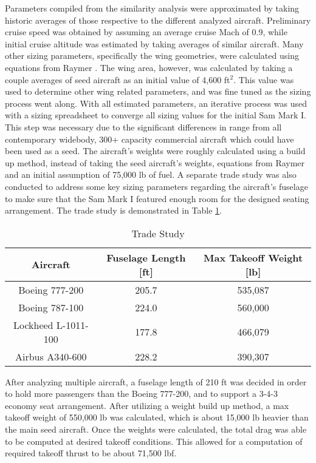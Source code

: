 Parameters compiled from the similarity analysis were approximated by taking historic averages of those respective to the different analyzed aircraft. Preliminary cruise speed was obtained by assuming an average cruise Mach of 0.9, while initial cruise altitude was estimated by taking averages of similar aircraft. Many other sizing parameters, specifically the wing geometries, were calculated using equations from Raymer \cite{raymer}. The wing area, however, was calculated by taking a couple averages of seed aircraft as an initial value of 4,600 ft$^2$. This value was used to determine other wing related parameters, and was fine tuned as the sizing process went along. With all estimated parameters, an iterative process was used with a sizing spreadsheet to converge all sizing values for the initial Sam Mark I. This step was necessary due to the significant differences in range from all contemporary widebody, 300+ capacity commercial aircraft which could have been used as a seed.  The aircraft's weights were roughly calculated using a build up method, instead of taking the seed aircraft's weights, equations from Raymer \cite{raymer} and an initial assumption of 75,000 lb of fuel. A separate trade study was also conducted to address some key sizing parameters regarding the aircraft's fuselage to make sure that the Sam Mark I featured enough room for the designed seating arrangement. The trade study is demonstrated in Table \ref{tab:trade_params}.

\begin{table}[!h] 
    \centering
    \caption{Trade Study}
    \begin{tabular}{ |c||c||c| }\toprule
    \textbf{Aircraft} & \textbf{Fuselage Length [ft]} & \textbf{Max Takeoff Weight [lb]} \\\hline\hline
    Boeing 777-200 & 205.7 & 535,087  \\\hline
    Boeing 787-100 & 224.0 & 560,000  \\\hline
    Lockheed L-1011-100 & 177.8 & 466,079  \\\hline
    Airbus A340-600 & 228.2 & 390,307  \\\hline

    \end{tabular}\label{tab:trade_params}
\end{table}

\newpage

After analyzing multiple aircraft, a fuselage length of 210 ft was decided in order to hold more passengers than the Boeing 777-200, and to support a 3-4-3 economy seat arrangement. After utilizing a weight build up method, a max takeoff weight of 550,000 lb was calculated, which is about 15,000 lb heavier than the main seed aircraft. Once the weights were calculated, the total drag was able to be computed at desired takeoff conditions. This allowed for a computation of required takeoff thrust to be about 71,500 lbf. 


